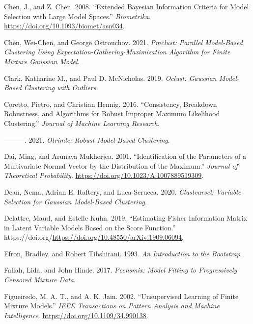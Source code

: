 \begin{CSLReferences}{1}{0}
\leavevmode{}%
Chen, J., and Z. Chen. 2008. {``Extended {Bayesian} Information Criteria for Model Selection with Large Model Spaces.''} \emph{Biometrika}. \url{https://doi.org/10.1093/biomet/asn034}.

\leavevmode{}%
Chen, Wei-Chen, and George Ostrouchov. 2021. \emph{Pmclust: Parallel Model-Based Clustering Using Expectation-Gathering-Maximization Algorithm for Finite Mixture Gaussian Model}.

\leavevmode{}%
Clark, Katharine M., and Paul D. McNicholas. 2019. \emph{Oclust: Gaussian Model-Based Clustering with Outliers}.

\leavevmode{}%
Coretto, Pietro, and Christian Hennig. 2016. {``Consistency, Breakdown Robustness, and Algorithms for Robust Improper Maximum Likelihood Clustering.''} \emph{Journal of Machine Learning Research}.

\leavevmode{}%
---------. 2021. \emph{Otrimle: Robust Model-Based Clustering}.

\leavevmode{}%
Dai, Ming, and Arunava Mukherjea. 2001. {``Identification of the {Parameters} of a {Multivariate Normal Vector} by the {Distribution} of the {Maximum}.''} \emph{Journal of Theoretical Probability}. \url{https://doi.org/10.1023/A:1007889519309}.

\leavevmode{}%
Dean, Nema, Adrian E. Raftery, and Luca Scrucca. 2020. \emph{Clustvarsel: Variable Selection for Gaussian Model-Based Clustering}.

\leavevmode{}%
Delattre, Maud, and Estelle Kuhn. 2019. {``Estimating {Fisher Information Matrix} in {Latent Variable Models} Based on the {Score Function}.''} https://doi.org/\url{https://doi.org/10.48550/arXiv.1909.06094}.

\leavevmode{}%
Efron, Bradley, and Robert Tibshirani. 1993. \emph{An {Introduction} to the {Bootstrap}}.

\leavevmode{}%
Fallah, Lida, and John Hinde. 2017. \emph{Pcensmix: Model Fitting to Progressively Censored Mixture Data}.

\leavevmode{}%
Figueiredo, M. A. T., and A. K. Jain. 2002. {``Unsupervised Learning of Finite Mixture Models.''} \emph{IEEE Transactions on Pattern Analysis and Machine Intelligence}. \url{https://doi.org/10.1109/34.990138}.


\end{CSLReferences}
